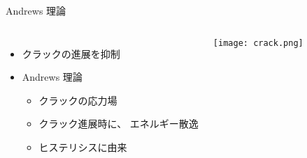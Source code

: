 \begin{itembox}[l]{Andrews 理論}
    \begin{columns}[totalwidth=.9\textwidth]
            \begin{itemize}
                \item クラックの進展を\alert{抑制}
                \item Andrews 理論\cite{andrews}
                    \begin{itemize}
                        \item クラックの応力場
                        \item クラック進展時に、{\color{red} エネルギー散逸}
                        \item \alert{ヒステリシスに由来}
                    \end{itemize}	
            \end{itemize}
            \texttt{[image: crack.png]}     
    \end{columns}
\end{itembox}


